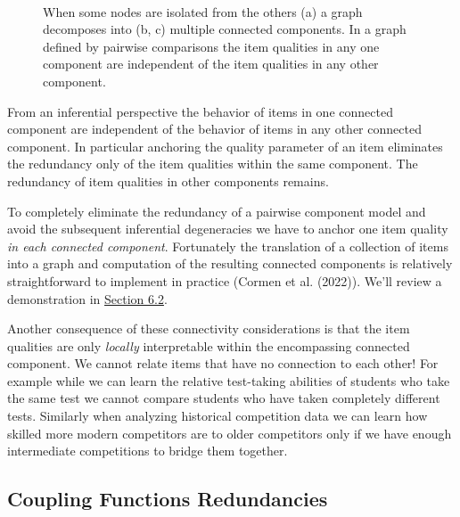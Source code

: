 \documentclass[
  letterpaper,
  DIV=11,
  numbers=noendperiod]{scrartcl}
\begin{document}
\begin{figure}
\begin{minipage}{0.33\linewidth}
{}

\subcaption{\label{fig-graph-decomposition3}}

\end{minipage}%
%
\begin{minipage}{0.01\linewidth}
~\end{minipage}%

\caption{\label{fig-graph-decomposition}When some nodes are isolated
from the others (a) a graph decomposes into (b, c) multiple connected
components. In a graph defined by pairwise comparisons the item
qualities in any one component are independent of the item qualities in
any other component.}

\end{figure}%

From an inferential perspective the behavior of items in one connected
component are independent of the behavior of items in any other
connected component. In particular anchoring the quality parameter of an
item eliminates the redundancy only of the item qualities within the
same component. The redundancy of item qualities in other components
remains.

To completely eliminate the redundancy of a pairwise component model and
avoid the subsequent inferential degeneracies we have to anchor one item
quality \emph{in each connected component}. Fortunately the translation
of a collection of items into a graph and computation of the resulting
connected components is relatively straightforward to implement in
practice (Cormen et al. (2022)). We'll review a demonstration in
\hyperref[sec:graph-utils]{Section 6.2}.

Another consequence of these connectivity considerations is that the
item qualities are only \emph{locally} interpretable within the
encompassing connected component. We cannot relate items that have no
connection to each other! For example while we can learn the relative
test-taking abilities of students who take the same test we cannot
compare students who have taken completely different tests. Similarly
when analyzing historical competition data we can learn how skilled more
modern competitors are to older competitors only if we have enough
intermediate competitions to bridge them together.

\subsection{Coupling Functions
Redundancies}\label{coupling-functions-redundancies}
\end{document}
